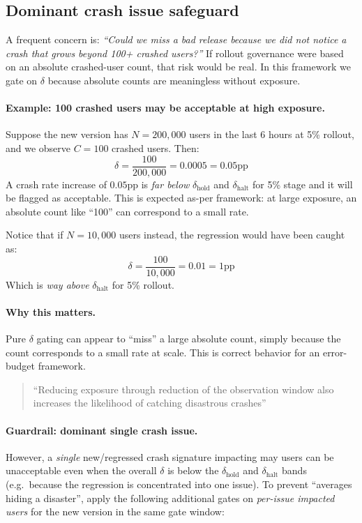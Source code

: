 \documentclass{article}
\newcommand{\pp}{\text{pp}}
\newcommand{\dhalt}{\delta_{\text{halt}}}
\newcommand{\dhold}{\delta_{\text{hold}}}
\begin{document}
\subsection{Dominant crash issue safeguard}

A frequent concern is: \emph{``Could we miss a bad release because we did not notice a crash that grows beyond 100+ crashed users?''}
If rollout governance were based on an absolute crashed-user count, that risk would be real. In this framework we gate on $\delta$ because absolute counts are meaningless without exposure.

\paragraph{Example: 100 crashed users may be acceptable at high exposure.}
Suppose the new version has $N=200{,}000$ users in the last 6 hours at 5\% rollout, and we observe $C=100$ crashed users.
Then:
\[
\delta = \frac{100}{200{,}000} = 0.0005 = 0.05\pp
\]
A crash rate increase of $0.05\pp$ is \emph{far below} $\dhold$ and $\dhalt$ for 5\% stage and it will be flagged as acceptable.
This is expected as-per framework: at large exposure, an absolute count like ``100'' can correspond to a small rate.

Notice that if $N=10{,}000$ users instead, the regression would have been caught as:
\[
\delta = \frac{100}{10{,}000} = 0.01 = 1\pp
\]
Which is \emph{way above} $\dhalt$ for 5\% rollout.

\paragraph{Why this matters.}
Pure $\delta$ gating can appear to ``miss'' a large absolute count, simply because the count corresponds to a small rate at scale.
This is correct behavior for an error-budget framework.

\begin{quote}
``Reducing exposure through reduction of the observation window also increases the likelihood of catching disastrous crashes''
\end{quote}

\paragraph{Guardrail: dominant single crash issue.}
However, a \emph{single} new/regressed crash signature impacting may users can be unacceptable even when the overall $\delta$
is below the $\dhold$ and $\dhalt$ bands (e.g.\ because the regression is concentrated into one issue).
To prevent ``averages hiding a disaster'', apply the following additional gates
on \emph{per-issue impacted users}
for the new version in the same gate window:
\end{document}
